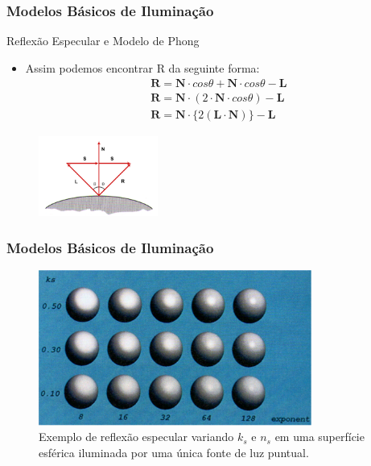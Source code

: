 \documentclass{beamer}
\begin{document}
\begin{frame}
\frametitle{Modelos Básicos de Iluminação}

	\begin{block}{Reflexão Especular e Modelo de Phong}
		\begin{itemize}
			\item Assim podemos encontrar R da seguinte forma:
				\begin{eqnarray*}
					\textbf{R} = \textbf{N} \cdot cos \theta +  \textbf{N} \cdot cos \theta - \textbf{L}\\
					\textbf{R} = \textbf{N} \cdot (2\cdot  \textbf{N} \cdot cos \theta) -\textbf{L} \\
					\textbf{R} = \textbf{N}\cdot  \{2 (\textbf{L} \cdot \textbf{N})\} -\textbf{L}
				\end{eqnarray*}
		\end{itemize}
	\end{block}
	
		\begin{figure}[!h]
		\begin{center}
		\includegraphics[width=0.35\textwidth]{Figures/ProRef}
		\end{center}
	\end{figure}	
\end{frame}


\begin{frame}
\frametitle{Modelos Básicos de Iluminação}
		\begin{figure}[!h]
		\begin{center}
		\includegraphics[width=0.8\textwidth]{Figures/ModPho}
		\caption{Exemplo de reflexão especular variando $k_s$ e $n_s$ em uma superfície esférica iluminada por uma única fonte de luz puntual.}
		\end{center}
	\end{figure}	
\end{frame}

\end{document}
